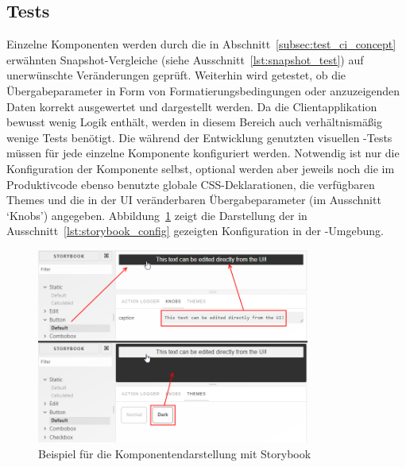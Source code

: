 \subsection{Tests}
Einzelne Komponenten werden durch die in Abschnitt~\ref{subsec:test_ci_concept} erwähnten Snapshot-Vergleiche (siehe Ausschnitt~\ref{lst:snapshot_test}) auf unerwünschte Veränderungen geprüft. Weiterhin wird getestet, ob die Übergabeparameter in Form von Formatierungsbedingungen oder anzuzeigenden Daten korrekt ausgewertet und dargestellt werden. Da die Clientapplikation bewusst wenig Logik enthält, werden in diesem Bereich auch verhältnismäßig wenige Tests benötigt.
Die während der Entwicklung genutzten visuellen -Tests müssen für jede einzelne Komponente konfiguriert werden. Notwendig ist nur die Konfiguration der Komponente selbst, optional werden aber jeweils noch die im Produktivcode ebenso benutzte globale CSS-Deklarationen, die verfügbaren Themes und die in der UI veränderbaren Übergabeparameter (im Ausschnitt `Knobs') angegeben. Abbildung~\ref{fig:storybook_example} zeigt die Darstellung der in Ausschnitt~\ref{lst:storybook_config} gezeigten Konfiguration in der -Umgebung.





\begin{figure}
    \centering
    \captionsetup{justification=centering}
    \includegraphics[width=0.8\textwidth]{figures/storybook_example.png}
        \caption{Beispiel für die Komponentendarstellung mit Storybook}\label{fig:storybook_example}
\end{figure}

